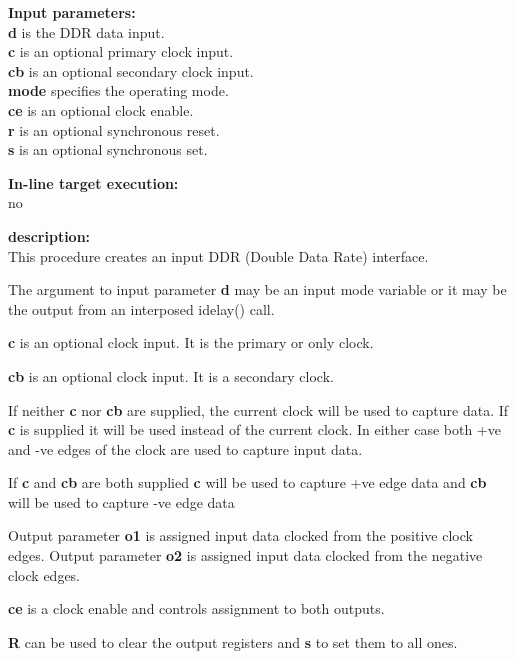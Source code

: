             {\bf Input parameters:} \\            
            {\bf d} is the DDR data input.\\
            {\bf c} is an optional primary clock input.\\
            {\bf cb} is an optional secondary clock input.\\
            {\bf mode} specifies the operating mode.\\
            {\bf ce} is an optional clock enable.\\
            {\bf r} is an optional synchronous reset.\\
            {\bf s} is an optional synchronous set.
        
            {\bf In-line target execution:} \\
            no

            {\bf description:} \\
            This procedure creates an input DDR (Double Data Rate) interface.
            
            The argument to input parameter {\bf d} may be an input mode
            variable or it may be the output from an interposed idelay() call.
            
            {\bf c} is an optional clock input. It is the primary or only
            clock.
            
            {\bf cb} is an optional clock input. It is a secondary clock.
            
            If neither {\bf c} nor {\bf cb} are supplied, the current clock will
            be used to capture data. If {\bf c} is supplied it will be used
            instead of the current clock. In either case both +ve and -ve edges
            of the clock are used to capture input data.
            
            If {\bf c} and {\bf cb} are both supplied {\bf c} will be used to
            capture +ve edge data and {\bf cb} will be used to capture -ve edge
            data
            
            Output parameter {\bf o1} is assigned input data clocked from the
            positive clock edges. Output parameter {\bf o2} is assigned input
            data clocked from the negative clock edges.
            
            {\bf ce} is a clock enable and controls assignment to both
            outputs.
            
            {\bf R} can be used to clear the output registers and {\bf s}
            to set them to all ones.
            
